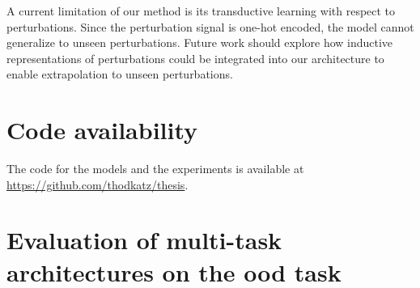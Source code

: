 \documentclass[12pt, a4paper]{article}
\begin{document}
A current limitation of our method is its transductive learning with respect to perturbations. Since the perturbation signal is one-hot encoded, the model cannot generalize to unseen perturbations. Future work should explore how inductive representations of perturbations could be integrated into our architecture to enable extrapolation to unseen perturbations.

\section{Code availability}

The code for the models and the experiments is available at \url{https://github.com/thodkatz/thesis}.

\clearpage


%



\clearpage

\appendix

\section{Evaluation of multi-task architectures on the \gls{ood} task}
\label{sec:appendix_evaluation}
\end{document}
